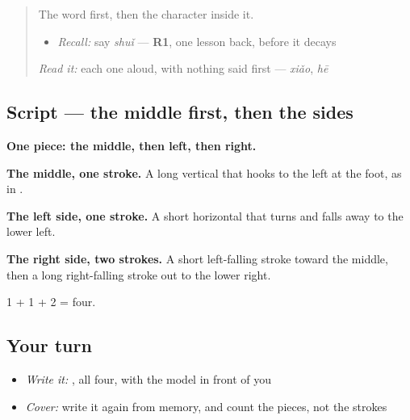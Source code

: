 \label{lesson:ZH-W39-shui}



\begin{quote}
The word first, then the character inside it.

\begin{itemize}
\raggedright
  \item \emph{Recall:} say \emph{shuǐ} — \textbf{R1}, one lesson back, before it decays
\end{itemize}

\begin{quote}
 
\end{quote}

\emph{Read it:} each one aloud, with nothing said first — \emph{xiǎo}, \emph{hē}
\end{quote}

\subsection*{Script — the middle first, then the sides}

\begin{quote}
\end{quote}

\textbf{One piece: the middle, then left, then right.}

\textbf{The middle, one stroke.} A long vertical that hooks to the left at the foot, as in .

\textbf{The left side, one stroke.} A short horizontal that turns and falls away to the lower left.

\textbf{The right side, two strokes.} A short left-falling stroke toward the middle, then a long right-falling stroke out to the lower right.

1 + 1 + 2 = four.

\subsection*{Your turn}
\begin{itemize}
\raggedright
  \item \emph{Write it:} , all four, with the model in front of you
  \item \emph{Cover:} write it again from memory, and count the pieces, not the strokes
\end{itemize}

